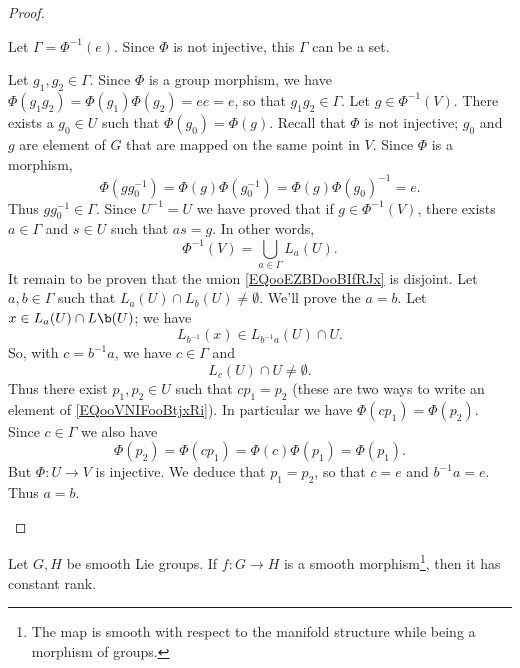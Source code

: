 \begin{proof}
\begin{subproof}
		Let \( \Gamma=\Phi^{-1}(e)\). Since \( \Phi\) is not injective, this \( \Gamma\) can be a set.
		\begin{subproof}
			Let \( g_1,g_2\in \Gamma\). Since \( \Phi\) is a group morphism, we have \( \Phi(g_1g_2)=\Phi(g_1)\Phi(g_2)=ee=e\), so that \( g_1g_2\in \Gamma\).
			\spitem[As an union]
			Let \( g\in\Phi^{-1}(V)\). There exists a \( g_0\in U\) such that \( \Phi(g_0)=\Phi(g)\). Recall that \( \Phi\) is not injective; \( g_0\) and \( g\) are element of \( G\) that are mapped on the same point in \( V\). Since \( \Phi\) is a morphism,
			\begin{equation}
				\Phi(gg_0^{-1})=\Phi(g)\Phi(g_0^{-1})=\Phi(g)\Phi(g_0)^{-1}=e.
			\end{equation}
			Thus \( gg_0^{-1}\in \Gamma\). Since \( U^{-1}=U\) we have proved that if \( g\in \Phi^{-1}(V)\), there exists \( a\in \Gamma\) and \( s\in U\) such that \( as=g\). In other words,
			\begin{equation}        \label{EQooEZBDooBIfRJx}
				\Phi^{-1}(V)=\bigcup_{a\in \Gamma}L_a(U).
			\end{equation}
			\spitem[Disjoint]
			It remain to be proven that the union \eqref{EQooEZBDooBIfRJx} is disjoint. Let \( a,b\in \Gamma\) such that \( L_a(U)\cap L_b(U)\neq \emptyset\). We'll prove the \( a=b\). Let \( x\in L_a(U)\cap L\b(U)\); we have
			\begin{equation}
				L_{b^{-1}}(x)\in L_{b^{-1} a}(U)\cap U.
			\end{equation}
			So, with \( c=b^{-1} a\), we have \( c\in\Gamma\) and
			\begin{equation}        \label{EQooVNIFooBtjxRi}
				L_c(U)\cap U\neq\emptyset.
			\end{equation}
			Thus there exist \( p_1,p_2\in U\) such that \( cp_1=p_2\) (these are two ways to write an element of \eqref{EQooVNIFooBtjxRi}). In particular we have \( \Phi(cp_1)=\Phi(p_2)\). Since \( c\in \Gamma\) we also have
			\begin{equation}
				\Phi(p_2)= \Phi(cp_1)=\Phi(c)\Phi(p_1)=\Phi(p_1).
			\end{equation}
			But \( \Phi\colon U\to V\) is injective. We deduce that \( p_1=p_2\), so that \( c=e\) and \( b^{-1}a=e\). Thus \( a=b\).
		\end{subproof}
	\end{subproof}
\end{proof}

\begin{proposition}        \label{PROPooIORNooLeuXPW}
	Let \( G,H\) be smooth Lie groups. If \( f\colon G\to H\) is a smooth morphism\footnote{The map is smooth with respect to the manifold structure while being a morphism of groups.}, then it has constant rank.
\end{proposition}

